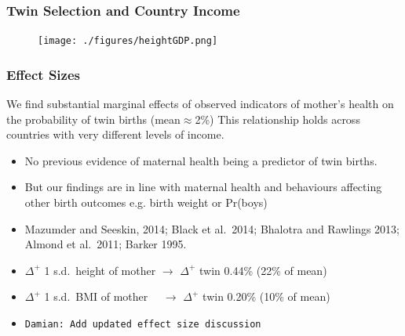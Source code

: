 \documentclass[9pt,letterpaper,subeqn]{beamer}
\begin{document}
\begin{frame}[label=Spain2]

\end{frame}

\begin{frame}[label=HealthGDP]
\frametitle{Twin Selection and Country Income}
\begin{figure}[htpb!]
\centering
  \texttt{[image: ./figures/heightGDP.png]}
\end{figure}
\hyperlink{EducGDP}{}
\end{frame}



\begin{frame}[label=robust]
\frametitle{Effect Sizes}
We find substantial marginal effects of observed indicators of mother’s health on the probability of twin births (mean$\approx$2\%)
This relationship holds across countries with very different levels of income.
\begin{itemize}
\item No previous evidence of maternal health being a predictor of twin births.
\item But our findings are in line with maternal health and behaviours affecting other birth outcomes e.g. birth weight or Pr(boys) 
\item Mazumder and Seeskin, 2014; Black et al.\ 2014;  Bhalotra and Rawlings 2013; Almond et al.\ 2011; Barker 1995.
  \item $\Delta^+$ 1 s.d.\ height of mother $\rightarrow$ $\Delta^+$ twin 0.44\% (22\% of mean)
  \item $\Delta^+$ 1 s.d.\ BMI of mother \ \ $\rightarrow$ $\Delta^+$ twin 0.20\% (10\% of mean)
  \item \texttt{Damian: Add updated effect size discussion}
\end{itemize}
\end{frame}
\end{document}
